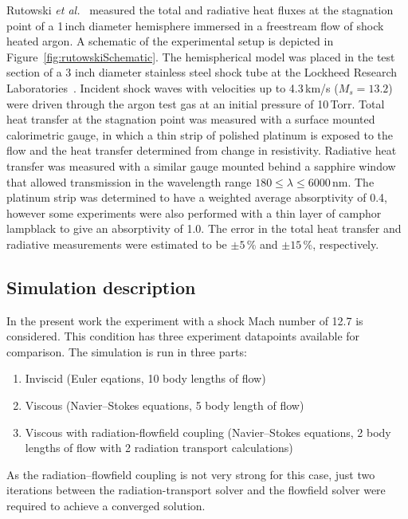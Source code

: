 Rutowski \textit{et al.}~\cite{RB64} measured the total and radiative heat fluxes at the stagnation point of a 1\,inch diameter hemisphere immersed in a freestream flow of shock heated argon.
A schematic of the experimental setup is depicted in Figure~\ref{fig:rutowskiSchematic}.
The hemispherical model was placed in the test section of a 3 inch diameter stainless steel shock tube at the Lockheed Research Laboratories~\cite{MBR+62}.  
Incident shock waves with velocities up to 4.3\,km/s ($M_s = 13.2$) were driven through the argon test gas at an initial pressure of 10\,Torr.
Total heat transfer at the stagnation point was measured with a surface mounted calorimetric gauge, in which a thin strip of polished platinum is exposed to the flow and the heat transfer determined from change in resistivity.
Radiative heat transfer was measured with a similar gauge mounted behind a sapphire window that allowed transmission in the wavelength range $180 \leq \lambda \leq 6000$\,nm.
The platinum strip was determined to have a weighted average absorptivity of 0.4, however some experiments were also performed with a thin layer of camphor lampblack to give an absorptivity of 1.0.
The error in the total heat transfer and radiative measurements were estimated to be $\pm 5$\,\% and $\pm 15$\,\%, respectively. 
 
 \subsection{Simulation description}

In the present work the experiment with a shock Mach number of 12.7 is considered.
This condition has three experiment datapoints available for comparison.
The simulation is run in three parts:

\begin{enumerate}
\item Inviscid (Euler eqations, 10 body lengths of flow)
\item Viscous (Navier--Stokes equations, 5 body length of flow)
\item Viscous with radiation-flowfield coupling (Navier--Stokes equations, 2 body lengths of flow with 2 radiation transport calculations)
\end{enumerate}

As the radiation--flowfield coupling is not very strong for this case, just two iterations between the radiation-transport solver and the flowfield solver were required to achieve a converged solution.

